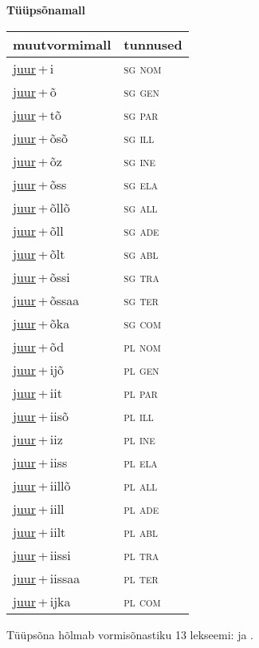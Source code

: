 
\vspace{1.8em}
\begin{minipage}{\textwidth}
\textbf{Tüüpsõnamall \,}\\

\begin{sideways}
\begin{tabular}{l l}
muutvormimall & tunnused \\
\hline
\underline{juur}\,+\,i & \textsc{ sg nom } \\
\underline{juur}\,+\,õ & \textsc{ sg gen } \\
\underline{juur}\,+\,tõ & \textsc{ sg par } \\
\underline{juur}\,+\,õsõ & \textsc{ sg ill } \\
\underline{juur}\,+\,õz & \textsc{ sg ine } \\
\underline{juur}\,+\,õss & \textsc{ sg ela } \\
\underline{juur}\,+\,õllõ & \textsc{ sg all } \\
\underline{juur}\,+\,õll & \textsc{ sg ade } \\
\underline{juur}\,+\,õlt & \textsc{ sg abl } \\
\underline{juur}\,+\,õssi & \textsc{ sg tra } \\
\underline{juur}\,+\,õssaa & \textsc{ sg ter } \\
\underline{juur}\,+\,õka & \textsc{ sg com } \\
\underline{juur}\,+\,õd & \textsc{ pl nom } \\
\underline{juur}\,+\,ijõ & \textsc{ pl gen } \\
\underline{juur}\,+\,iit & \textsc{ pl par } \\
\underline{juur}\,+\,iisõ & \textsc{ pl ill } \\
\underline{juur}\,+\,iiz & \textsc{ pl ine } \\
\underline{juur}\,+\,iiss & \textsc{ pl ela } \\
\underline{juur}\,+\,iillõ & \textsc{ pl all } \\
\underline{juur}\,+\,iill & \textsc{ pl ade } \\
\underline{juur}\,+\,iilt & \textsc{ pl abl } \\
\underline{juur}\,+\,iissi & \textsc{ pl tra } \\
\underline{juur}\,+\,iissaa & \textsc{ pl ter } \\
\underline{juur}\,+\,ijka & \textsc{ pl com } \\
\end{tabular}
\end{sideways}
\label{tab:tüüpsõnamall-juuri}

\end{minipage}

 
\vspace{1em}
\noindent Tüüpsõna hõlmab vormisõnastiku 13 lekseemi:  ja .
